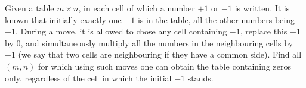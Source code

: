 Given a table $m\times n$,  in each cell of which a number $+1$ or $-1$ is written. It is known that initially exactly one $-1$ is in the table, all the other numbers being $+1$. During a move, it is allowed to chose any cell containing $-1$,  replace this $-1$ by $0$,  and simultaneously multiply all the numbers in the neighbouring cells by $-1$ (we say that two cells are neighbouring if they have a common side). Find all $(m,n)$ for which using such moves one can obtain the table containing zeros only, regardless of the cell in which the initial $-1$ stands.